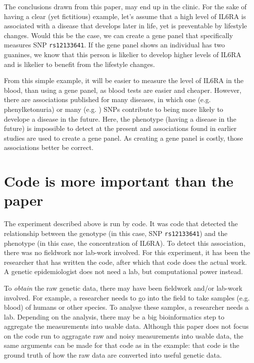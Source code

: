 The conclusions drawn from this paper,
may end up in the clinic.
For the sake of having a clear (yet fictitious) example,
let's assume that a high level of IL6RA 
is associated with a disease that develops later in life,
yet is preventable by lifestyle changes.
Would this be the case, we can create a gene panel that specifically measures
SNP \verb|rs12133641|. 
If the gene panel shows an individual has two guanines, 
we know that this person is likelier to develop higher levels of
IL6RA and is likelier to benefit from the lifestyle changes.

From this simple example, it will be easier
to measure the level of IL6RA in the blood, than using a gene panel,
as blood tests are easier and cheaper.
However, there are associations published for many diseases,
in which one (e.g. phenylketonuria) or many (e.g. \cite{bruce2009metabolic}) 
SNPs contribute to being more likely to develope a disease in the future. 
Here, the phenotype (having a disease in the future) 
is impossible to detect at the present
and associations found in earlier studies are used to create a gene panel.
As creating a gene panel is costly, those associations better be correct.

\section{Code is more important than the paper}


The experiment described above is run by code. 
It was code that detected the relationship between the genotype
(in this case, SNP \verb|rs12133641|) 
and the phenotype (in this case, the concentration of IL6RA).
To detect this association, 
there was no fieldwork nor lab-work involved.
For this experiment, 
it has been the researcher that has written the code,
after which that code does the actual work. 
A genetic epidemiologist does not need a lab, but computational power instead.

To \emph{obtain} the raw genetic data, there may have been fieldwork and/or lab-work
involved. For example, a researcher needs to go into the field to take
samples (e.g. blood) of humans or other species. 
To analyse these samples,
a researcher needs a lab. 
Depending on the analysis, there may be a big bioinformatics step
to aggregate the measurements into usable data. 
Although this paper does not focus on the code run to 
aggragate raw and noisy measurements into usable data, the same arguments
can be made for that code as in the example: that code is 
the ground truth of how the raw data are converted into useful genetic data.

